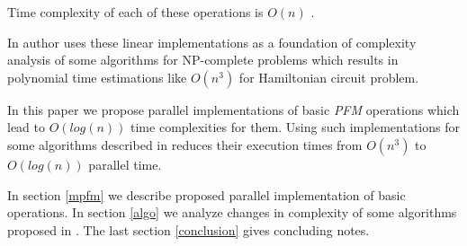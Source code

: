 


Time complexity of each of these operations is $O(n)$ \cite{Amos:1997, Katsanyi:2003}.

In \cite{Katsanyi:2003} author uses these linear implementations as a foundation of complexity analysis of some algorithms for NP-complete problems which results in polynomial time estimations like $O(n^3)$ for Hamiltonian circuit problem.

In this paper we propose parallel implementations of basic \emph{PFM} operations which lead to $O(log(n))$ time complexities for them. Using such implementations for some algorithms described in \cite{Katsanyi:2003} reduces their execution times from $O(n^3)$ to $O(log(n))$ parallel time.

In section \ref{mpfm} we describe proposed parallel implementation of basic operations. In section \ref{algo} we analyze changes in complexity of some algorithms proposed in \cite{Katsanyi:2003}. The last section \ref{conclusion} gives concluding notes.